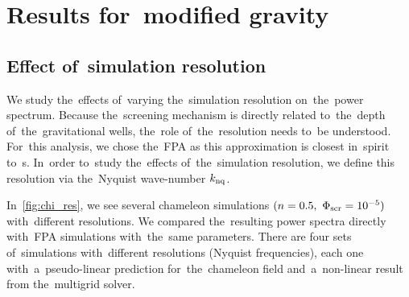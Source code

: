 \section{Results for~modified gravity}
\newcommand{\chileft}{\hspace*{-1cm}}

% 
\subsection{Effect of~simulation resolution}
We study the~effects of~varying the~simulation resolution on~the~power spectrum. Because the~screening mechanism is directly related to~the~depth of~the~gravitational wells, the~role of~the~resolution needs to~be understood. For~this analysis, we chose the~FPA as this approximation is closest in~spirit to~\nbodysim s. In~order to~study the~effects of~the~simulation resolution, we define this resolution via the~Nyquist wave-number $k_{\rm nq}$.


In~\autoref{fig:chi_res}, we see several chameleon simulations $(n=0.5,\ \Phi_{\text{\scriptsize scr}}=10^{-5})$ with~different resolutions. We compared the~resulting power spectra directly with~FPA simulations with~the~same parameters. There are four sets of~simulations with~different resolutions (Nyquist frequencies), each one with~a~pseudo-linear prediction for~the~chameleon field and~a~non-linear result from the~multigrid solver.

